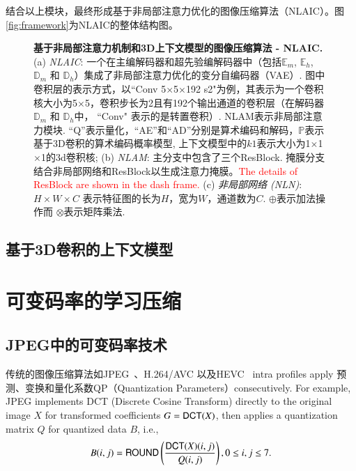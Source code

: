 \documentclass[macfonts,phd,oneside,nobackinfo]{njuthesis}
\begin{document}
结合以上模块，最终形成基于非局部注意力优化的图像压缩算法（NLAIC）。图\ref{fig:framework}为NLAIC的整体结构图。
\begin{figure*}[t]
   \centering
   \hspace{20mm}
   \caption{{\bf 基于非局部注意力机制和3D上下文模型的图像压缩算法 - NLAIC.} (a) {\it NLAIC}:  一个在主编解码器和超先验编解码器中（包括$\mathbb{E}_m$, $\mathbb{E}_h$, $\mathbb{D}_m$ 和 $\mathbb{D}_h$）集成了非局部注意力优化的变分自编码器（VAE）. 图中卷积层的表示方式，以``Conv 5$\times$5$\times$192 s2"为例，其表示为一个卷积核大小为5$\times$5，卷积步长为2且有192个输出通道的卷积层（在解码器 $\mathbb{D}_m$ 和 $\mathbb{D}_h$中， ``Conv" 表示的是转置卷积）. NLAM表示非局部注意力模块.  ``Q''表示量化，``AE''和``AD''分别是算术编码和解码，$\mathbb{P}$表示基于3D卷积的算术编码概率模型, 上下文模型中的$k1$表示大小为1$\times$1$\times$1的3d卷积核; (b) {\it NLAM}: 主分支中包含了三个ResBlock. 掩膜分支结合非局部网络和ResBlock以生成注意力掩膜。\textcolor{red}{The details of ResBlock are shown in the dash frame.} (c) {\it 非局部网络 (NLN)}: $H\times{W}\times{C}$ 表示特征图的长为$H$，宽为$W$，通道数为$C$. $\oplus$表示加法操作而 $\otimes$表示矩阵乘法. }
\end{figure*}

\subsection{基于3D卷积的上下文模型}

\section{可变码率的学习压缩}
\subsection{JPEG中的可变码率技术}
传统的图像压缩算法如JPEG~\cite{Acharya2005JPEG}、H.264/AVC 以及HEVC~\cite{Sullivan2013Overview} intra profiles apply 预测、变换和量化系数QP（Quantization Parameters）consecutively. For example,
JPEG implements DCT (Discrete Cosine Transform) directly to the original image $X$ for transformed coefficients $G = {\sf DCT}(X)$, then applies a quantization matrix $Q$  for quantized data $B$, i.e.,
\begin{equation}
B(i,j) = {\sf ROUND}\left(\frac{{\sf DCT}(X)(i,j)}{Q(i,j)}\right), 0\leq i,j\leq7.
\end{equation}
\end{document}
